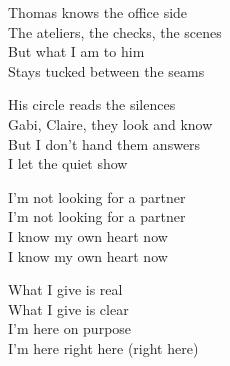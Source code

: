 \begin{lyrics}
Thomas knows the office side\\
The ateliers, the checks, the scenes\\
But what I am to him\\
Stays tucked between the seams

His circle reads the silences\\
Gabi, Claire, they look and know\\
But I don’t hand them answers\\
I let the quiet show

I’m not looking for a partner\\
I’m not looking for a partner\\
I know my own heart now\\
I know my own heart now

What I give is real\\
What I give is clear\\
I’m here on purpose\\
I’m here right here (right here)
\end{lyrics}

